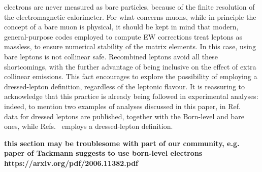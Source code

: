 electrons are never measured as bare particles, because of the finite resolution 
of the electromagnetic calorimeter. For what concerns muons, while in principle the concept of a bare muon is physical, it should be kept in
mind that modern, general-purpose codes employed to
compute EW corrections treat leptons as massless, to ensure numerical stability of the matrix elements. In this case, using bare leptons is not collinear safe. Recombined
leptons avoid all these shortcomings, with the further advantage of being 
inclusive on the effect of extra collinear emissions. This fact encourages to explore the possibility of employing a dressed-lepton
definition, regardless of the leptonic flavour. It is reassuring to acknowledge that this practice is already being followed in experimental analyses:
indeed, to mention two examples of analyses discussed in this paper, in Ref.~\cite{Aad:2015auj} data for dressed leptons are published, together with the Born-level
and bare ones, while Refs.~\cite{Sirunyan:2019bzr} employs a dressed-lepton definition.

{\bf this section may be troublesome with part of our community, e.g. paper of Tackmann suggests to use born-level electrons https://arxiv.org/pdf/2006.11382.pdf}
